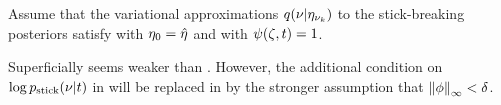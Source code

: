 \begin{assu}
%
Assume that the variational approximations $q(\nu \vert \eta_{\nu_{k}})$ to the
stick-breaking posteriors satisfy  with $\eta_0 =
\hat\eta$ and with $\psi(\zeta, t) = 1$.
%
\end{assu}

Superficially  seems weaker than
.  However, the additional condition on $\log
p_{\mathrm{stick}}(\nu \vert t)$ in  will be replaced in
 by the stronger assumption that $\left\Vert\phi\right\Vert_{\infty} <
\delta$.

